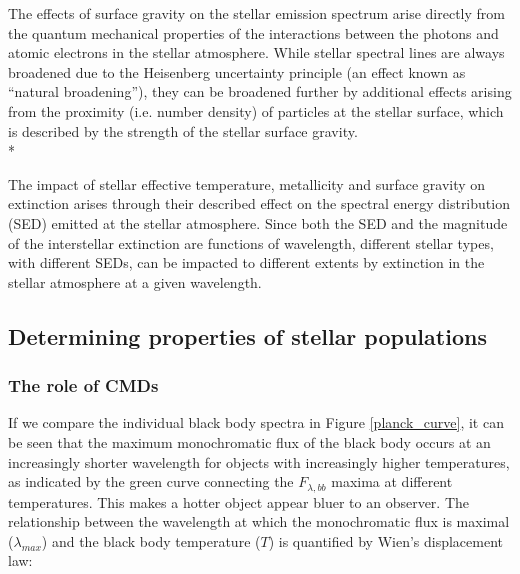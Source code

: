 \documentclass[12pt, a4paper]{report}
\begin{document}

The effects of surface gravity on the stellar emission spectrum arise directly from the quantum mechanical properties of the interactions between the photons and atomic electrons in the stellar atmosphere. While stellar spectral lines are always broadened due to the Heisenberg uncertainty principle (an effect known as ``natural broadening''), they can be broadened further by additional effects arising from the proximity (i.e. number density) of particles at the stellar surface, which is described by the strength of the stellar surface gravity. \\*


The impact of stellar effective temperature, metallicity and surface gravity on extinction arises through their described effect on the spectral energy distribution (SED) emitted at the stellar atmosphere. Since both the SED and the magnitude of the interstellar extinction are functions of wavelength, different stellar types, with different SEDs, can be impacted to different extents by extinction in the stellar atmosphere at a given wavelength.

\subsection{Determining properties of stellar populations}
\subsubsection{The role of CMDs} \label{CMDs_intro}
If we compare the individual black body spectra in Figure \ref{planck_curve}, it can be seen that the maximum monochromatic flux of the black body occurs at an increasingly shorter wavelength for objects with increasingly higher temperatures, as indicated by the green curve connecting the $F_{\lambda,bb}$ maxima at different temperatures. This makes a hotter object appear bluer to an observer. The relationship between the wavelength at which the monochromatic flux is maximal ($\lambda_{max}$) and the black body temperature ($T$) is quantified by Wien's displacement law:
\end{document}
